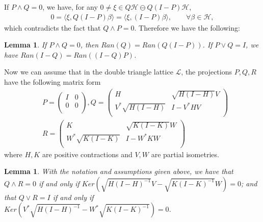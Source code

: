 \documentclass{jaums}
\theoremstyle{thmit} %
\newtheorem{lemma}[theorem]{Lemma}
\theoremstyle{thmrm} %
\begin{document}
If $P \wedge Q = 0$, we have, for any $0 \neq \xi \in
Q\mathcal{H} \ominus Q(I-P)\mathcal{H}$,
\begin{align*}
0 = \langle\xi, Q(I-P)\beta\rangle = \langle\xi, (I-P)\beta\rangle, \qquad
\forall \beta \in \mathcal{H},
\end{align*}
which contradicts the fact that $Q \wedge P = 0$.
Therefore we have the following:

\begin{lemma}
If $P \wedge Q = 0$, then $Ran(Q) = Ran(Q(I-P))$. If $P \vee Q = I$,
we have $Ran(I-Q) = Ran((I-Q)P)$.
\end{lemma}




Now we can assume that in the double triangle lattice $\mathcal{L}$, the
projections $P,Q,R$ have the following matrix form
\begin{align*}
&P=\left(
      \begin{array}{cc}
        I & 0  \\
        0 & 0  \\
      \end{array}
    \right), Q=\left(
      \begin{array}{cc}
        H & \sqrt{H(I-H)}V  \\
        V^*\sqrt{H(I-H)} & I-V^*HV \\
      \end{array}
    \right)\\
&R=\left(
      \begin{array}{cc}
        K & \sqrt{K(I-K)}W  \\
        W^{*}\sqrt{K(I-K)} & I-W^{*}KW \\
      \end{array}
    \right)
\end{align*}
where $H, K$ are positive contractions and $V,W$ are partial isometries.


\begin{lemma} With the notation and assumptions given above, we have that
$Q\wedge R=0$ if and only if $Ker(\sqrt{H(I-H)^{-1}}V - \sqrt{K(I-K)^{-1}}W)
= 0$; and that $Q\vee R=I$ if and only if $Ker(V^{*}\sqrt{H(I-H)^{-1}} -
W^{*}\sqrt{K(I-K)^{-1}}) = 0 $.
\end{lemma}
\end{document}
